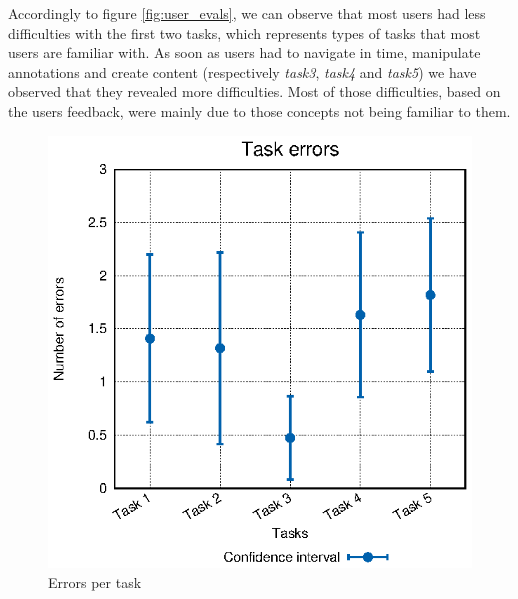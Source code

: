 Accordingly to figure \ref{fig:user_evals}, we can observe that most users had less difficulties with the first two tasks, which represents types of tasks that most users are familiar with. As soon as users had to navigate in time, manipulate annotations and create content (respectively \emph{task3}, \emph{task4} and \emph{task5}) we have observed that they revealed more difficulties. Most of those difficulties, based on the users feedback, were mainly due to those concepts not being familiar to them.

\begin{figure}[!htb]
\centering
\begin{minipage}{.5\textwidth}
  \centering
    \includegraphics[width=\textwidth]{stats/user_errors.eps}
  \caption{Errors per task}
  \label{fig:user_errors}
\end{minipage}%
\begin{minipage}{.5\textwidth}
  \centering

\end{minipage}
\end{figure}
